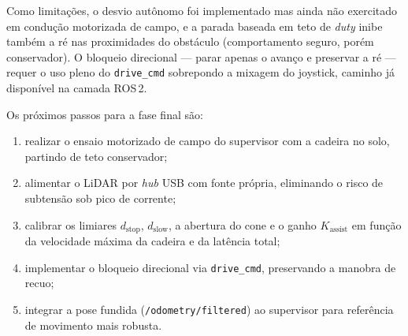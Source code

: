\documentclass[conference]{IEEEtran}
\begin{document}
Como limitações, o desvio autônomo foi implementado mas ainda não exercitado em
condução motorizada de campo, e a parada baseada em teto de \emph{duty} inibe
também a ré nas proximidades do obstáculo (comportamento seguro, porém
conservador). O bloqueio direcional --- parar apenas o avanço e preservar a ré
--- requer o uso pleno do \texttt{drive\_cmd} sobrepondo a mixagem do joystick,
caminho já disponível na camada ROS\,2.

Os próximos passos para a fase final são:
\begin{enumerate}
\item realizar o ensaio motorizado de campo do supervisor com a cadeira no solo,
partindo de teto conservador;
\item alimentar o LiDAR por \emph{hub} USB com fonte própria, eliminando o risco
de subtensão sob pico de corrente;
\item calibrar os limiares $d_{\text{stop}}$, $d_{\text{slow}}$, a abertura do
cone e o ganho $K_{\text{assist}}$ em função da velocidade máxima da cadeira e
da latência total;
\item implementar o bloqueio direcional via \texttt{drive\_cmd}, preservando a
manobra de recuo;
\item integrar a pose fundida (\texttt{/odometry/filtered}) ao supervisor para
referência de movimento mais robusta.
\end{enumerate}
\end{document}
